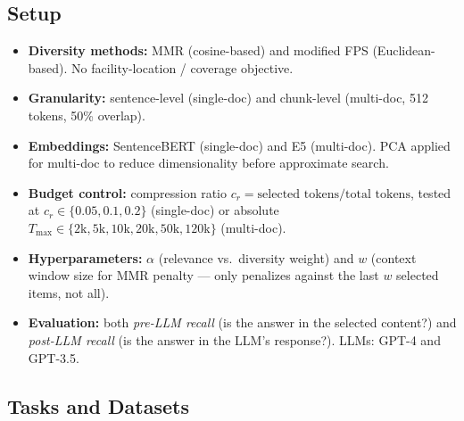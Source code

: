 \documentclass[11pt,a4paper]{article}
\begin{document}
\subsection{Setup}

\begin{itemize}[leftmargin=*]
	\item \textbf{Diversity methods:} MMR (cosine-based) and modified FPS (Euclidean-based). No facility-location / coverage objective.
	\item \textbf{Granularity:} sentence-level (single-doc) and chunk-level (multi-doc, 512 tokens, 50\% overlap).
	\item \textbf{Embeddings:} SentenceBERT (single-doc) and E5 (multi-doc). PCA applied for multi-doc to reduce dimensionality before approximate search.
	\item \textbf{Budget control:} compression ratio $c_r = \text{selected tokens} / \text{total tokens}$, tested at $c_r \in \{0.05, 0.1, 0.2\}$ (single-doc) or absolute $T_{\max} \in \{2\text{k}, 5\text{k}, 10\text{k}, 20\text{k}, 50\text{k}, 120\text{k}\}$ (multi-doc).
	\item \textbf{Hyperparameters:} $\alpha$ (relevance vs.\ diversity weight) and $w$ (context window size for MMR penalty --- only penalizes against the last $w$ selected items, not all).
	\item \textbf{Evaluation:} both \emph{pre-LLM recall} (is the answer in the selected content?) and \emph{post-LLM recall} (is the answer in the LLM's response?). LLMs: GPT-4 and GPT-3.5.
\end{itemize}

\subsection{Tasks and Datasets}
\end{document}
